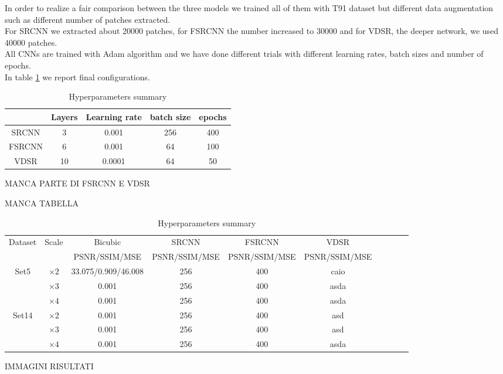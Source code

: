 \documentclass[10pt,twocolumn,letterpaper]{article}
\begin{document}
In order to realize a fair comparison between the three models we trained all of them with T91 dataset but different data augmentation such as different number of patches extracted.\\
For SRCNN we extracted about 20000 patches, for FSRCNN the number increased to 30000 and for VDSR, the deeper network, we used 40000 patches.\\
All CNNs are trained with  Adam algorithm \cite{kingma2014adam} and we have done different trials with different learning rates, batch sizes and number of epochs.\\
In table \ref{param} we report final configurations.
\begin{table}[h!]
\begin{center}
	\begin{tabular}{|c| c| c| c| c|} 
		
		\hline
		& Layers & Learning rate & batch size & epochs \\ 
		\hline
		SRCNN & 3 & 0.001 & 256 & 400 \\
		\hline
		FSRCNN & 6 & 0.001 & 64 & 100\\
		\hline
		VDSR & 10 & 0.0001 & 64 & 50\\
		\hline
	\end{tabular}
\label{param}
\end{center}
\caption{Hyperparameters summary}
\end{table}

MANCA PARTE DI FSRCNN E VDSR

MANCA TABELLA 
\begin{table}
\begin{center}
	\begin{tabular}{|c| c| c| c| c| c| c| c| c| c|} 
		
		\hline
		Dataset & Scale & Bicubic  & SRCNN & FSRCNN & VDSR\\ 
		 &  & PSNR/SSIM/MSE &PSNR/SSIM/MSE & PSNR/SSIM/MSE & PSNR/SSIM/MSE \\ 
		\hline
		\multirow{3}{*}{Set5} & $\times2$ & 33.075/0.909/46.008 & 256 & 400 & caio\\
		 									& $\times3$ & 0.001 & 256 & 400 & asda\\
		 									& $\times4$ & 0.001 & 256 & 400 &asda\\
		\hline
		\multirow{3}{*}{Set14} & $\times2$ & 0.001 & 256 & 400 &asd\\
											& $\times3$ & 0.001 & 256 & 400 &asd\\
											& $\times4$ & 0.001 & 256 & 400 &asda\\
		\hline
	\end{tabular}
\label{results}
\end{center}
\caption{Hyperparameters summary}
\end{table}
IMMAGINI RISULTATI
\end{document}
